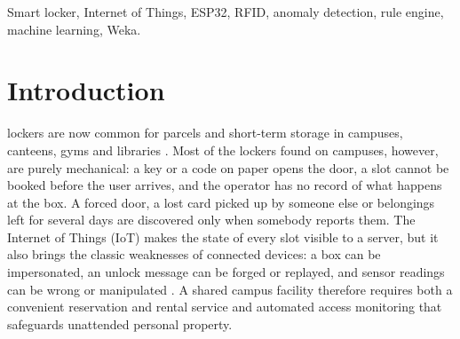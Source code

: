 \maketitle

\begin{abstract}
Shared lockers on university campuses are still opened with mechanical keys or paper codes, cannot be reserved,
and give staff no view of forced doors, lost cards or forgotten items; once networked, their unlock signal can also be
forged or replayed. This paper presents SmartLocker, a locker rental system in which users reserve a slot on a web map,
pay from a prepaid wallet and open it with a personal identification number (PIN), a radio-frequency identification
(RFID) card, a fingerprint or a phone page. The ESP32 box takes no access decision: it forwards every credential to the
server, which replies \texttt{UNLOCK} or \texttt{DENY}. Abnormal access is detected mainly by a priority-ordered rule
engine over device telemetry and server context, which recognises sensor faults, spoofed remote opens, lost cards,
forced opening, wrong-user access, items left behind and overdue storage. A machine-learning risk score is kept only as
a secondary signal and raises an alert for sessions that no rule explains. On synthetic labelled sessions, the best of
four Weka classifiers made almost all of its errors between wrong-user and normal sessions, which share the same
telemetry by construction; identity is therefore checked by rule, and the score should be trusted only once real
sessions are available. All automated tests and replayed detection scenarios passed, and the server answered every
device request within about 0.1~s.
\end{abstract}

\begin{IEEEkeywords}
Smart locker, Internet of Things, ESP32, RFID, anomaly detection, rule engine, machine learning, Weka.
\end{IEEEkeywords}

\section{Introduction}

 lockers are now common for parcels and short-term storage in campuses, canteens, gyms
and libraries \cite{iwan2016parcel}. Most of the lockers found on campuses, however, are purely mechanical: a key or a
code on paper opens the door, a slot cannot be booked before the user arrives, and the operator has no record of what
happens at the box. A forced door, a lost card picked up by someone else or belongings left for several days are
discovered only when somebody reports them. The Internet of Things (IoT) \cite{alfuqaha2015iot} makes the state of
every slot visible to a server, but it also brings the classic weaknesses of connected devices: a box can be
impersonated, an unlock message can be forged or replayed, and sensor readings can be wrong or manipulated
\cite{sicari2015security, roman2013features}. A shared campus facility therefore requires both a convenient reservation
and rental service and automated access monitoring that safeguards unattended personal property.

